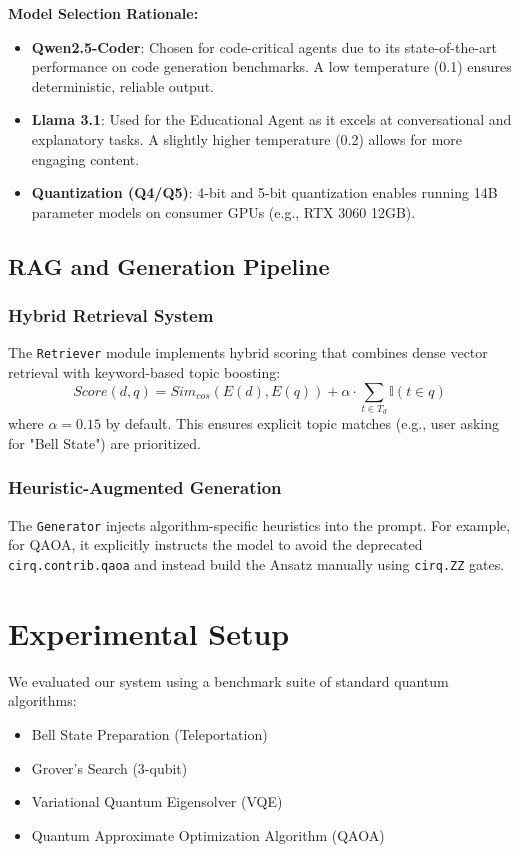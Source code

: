\documentclass[runningheads]{llncs}
\begin{document}
\textbf{Model Selection Rationale:}
\begin{itemize}
    \item \textbf{Qwen2.5-Coder}: Chosen for code-critical agents due to its state-of-the-art performance on code generation benchmarks. A low temperature (0.1) ensures deterministic, reliable output.
    \item \textbf{Llama 3.1}: Used for the Educational Agent as it excels at conversational and explanatory tasks. A slightly higher temperature (0.2) allows for more engaging content.
    \item \textbf{Quantization (Q4/Q5)}: 4-bit and 5-bit quantization enables running 14B parameter models on consumer GPUs (e.g., RTX 3060 12GB).
\end{itemize}

\subsection{RAG and Generation Pipeline}
\subsubsection{Hybrid Retrieval System}
The \texttt{Retriever} module implements hybrid scoring that combines dense vector retrieval with keyword-based topic boosting:
\begin{equation}
Score(d, q) = Sim_{cos}(E(d), E(q)) + \alpha \cdot \sum_{t \in T_d} \mathbb{I}(t \in q)
\end{equation}
where $\alpha = 0.15$ by default. This ensures explicit topic matches (e.g., user asking for "Bell State") are prioritized.

\subsubsection{Heuristic-Augmented Generation}
The \texttt{Generator} injects algorithm-specific heuristics into the prompt. For example, for QAOA, it explicitly instructs the model to avoid the deprecated \texttt{cirq.contrib.qaoa} and instead build the Ansatz manually using \texttt{cirq.ZZ} gates.

\section{Experimental Setup}

We evaluated our system using a benchmark suite of standard quantum algorithms:
\begin{itemize}
    \item Bell State Preparation (Teleportation)
    \item Grover's Search (3-qubit)
    \item Variational Quantum Eigensolver (VQE)
    \item Quantum Approximate Optimization Algorithm (QAOA) \cite{farhi2014quantum}
\end{itemize}
\end{document}
